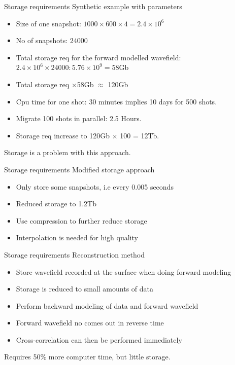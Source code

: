 \documentclass[xcolor=dvipsnames,notes]{beamer}
\begin{document}
\begin{frame}{Storage requirements}
Synthetic example with parameters
\begin{itemize}
\item Size of one snapshot: $1000 \times 600 \times 4 = 2.4 \times 10^6$
\item No of snapshots: $24000$
\item Total storage req for the forward modelled wavefield: $2.4\times 10^6\times 24000: 5.76\times 10^9 = $58Gb
\item Total storage req $\times$58Gb $\approx$ 120Gb
\item Cpu time for one shot: 30 minutes implies 10 days for 500 shots.
\item Migrate 100 shots in parallel: 2.5 Hours.
\item Storage req increase to 120Gb $\times$ 100 = 12Tb.
\end{itemize}
Storage is a problem with this approach.
\end{frame}
\begin{frame}{Storage requirements}
Modified storage approach
\begin{itemize}
\item Only store some snapshots, i.e every 0.005 seconds
\item Reduced storage to 1.2Tb
\item Use compression to further reduce storage
\item Interpolation is needed for high quality
\end{itemize}
\end{frame}
\begin{frame}{Storage requirements}
Reconstruction method
\begin{itemize}
\item Store wavefield recorded at the surface when doing forward modeling
\item Storage is reduced to small amounts of data
\item Perform backward modeling of data and forward wavefield 
\item Forward wavefield no comes out in reverse time
\item Cross-correlation can then be performed immediately
\end{itemize}
Requires 50\% more computer time, but little storage.
\end{frame}
\end{document}
